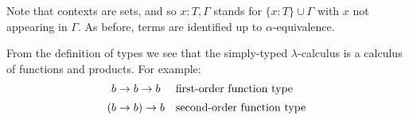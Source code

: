 \documentclass{svmult}
\begin{document}
\begin{center}
\renewcommand{\arraystretch}{.5}
\label{t:SimTyp}
\end{center}%
%
Note that contexts are sets, and so $x : T,\Gamma$ stands for $\{x:T\}\cup\Gamma$ with $x$ not appearing in $\Gamma$. As before, terms are identified up to $\alpha$-equivalence.

From the definition of types we see that the simply-typed $\lambda$-calculus is a calculus of functions and products.
For example:
\[\begin{array}{c@{\quad}l}
 b \rightarrow b \rightarrow b & \mbox{first-order function type} \\[5pt]
(b \rightarrow b ) \rightarrow b & \mbox{second-order function type}
\end{array}\]

\end{document}
